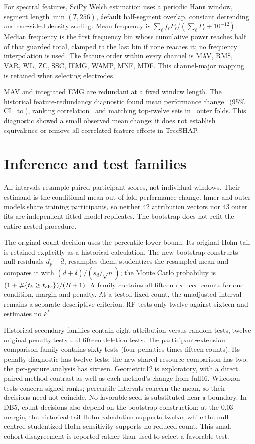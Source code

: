 \documentclass{iopjournal}
\begin{document}
For spectral features, SciPy Welch estimation uses a periodic Hann window, segment length $\min(T,256)$, default half-segment overlap, constant detrending and one-sided density scaling. Mean frequency is $\sum_\ell f_\ell P_\ell/(\sum_\ell P_\ell+10^{-12})$. Median frequency is the first frequency bin whose cumulative power reaches half of that guarded total, clamped to the last bin if none reaches it; no frequency interpolation is used. The feature order within every channel is MAV, RMS, VAR, WL, ZC, SSC, IEMG, WAMP, MNF, MDF. This channel-major mapping is retained when selecting electrodes.

MAV and integrated EMG are redundant at a fixed window length. The historical feature-redundancy diagnostic found mean performance change \RedundDiff\ (95\% CI \RedundLCB\ to \RedundUCB), ranking correlation \RedundRho\ and matching top-twelve sets in \RedundTopTwelveSame\ outer folds. This diagnostic showed a small observed mean change; it does not establish equivalence or remove all correlated-feature effects in TreeSHAP.

\section{Inference and test families}
All intervals resample paired participant scores, not individual windows. Their estimand is the conditional mean out-of-fold performance change. Inner and outer models share training participants, so neither 42 attribution vectors nor 43 outer fits are independent fitted-model replicates. The bootstrap does not refit the entire nested procedure.

The original count decision uses the percentile lower bound. Its original Holm tail is retained explicitly as a historical calculation. The new bootstrap constructs null residuals $d_p-\bar d$, resamples them, studentizes the resampled mean and compares it with $(\bar d+\delta)/(s_d/\sqrt n)$; the Monte Carlo probability is $(1+\#\{t_b\ge t_{\rm obs}\})/(B+1)$. A family contains all fifteen reduced counts for one condition, margin and penalty. At a tested fixed count, the unadjusted interval remains a separate descriptive criterion. RF tests only twelve against sixteen and estimates no $k^*$.

Historical secondary families contain eight attribution-versus-random tests, twelve original penalty tests and fifteen deletion tests. The participant-extension comparison family contains sixty tests (four penalties times fifteen counts). Its penalty diagnostic has twelve tests; the new shared-resource comparison has two; the per-gesture analysis has sixteen. Geometric12 is exploratory, with a direct paired method contrast as well as each method's change from full16. Wilcoxon tests concern signed ranks; percentile intervals concern the mean, so their decisions need not coincide. No favorable seed is substituted near a boundary. In DB5, count decisions also depend on the bootstrap construction: at the 0.03 margin, the historical tail-Holm calculation supports twelve, while the null-centred studentized Holm sensitivity supports no reduced count. This small-cohort disagreement is reported rather than used to select a favorable test.
\end{document}
